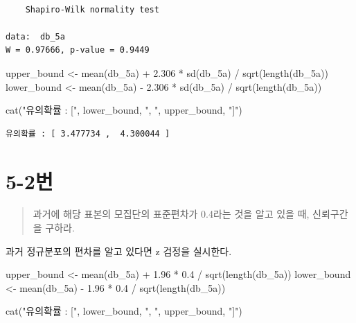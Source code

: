 \documentclass[
  letterpaper,
  DIV=11,
  numbers=noendperiod]{scrreprt}
\newenvironment{Shaded}{\begin{snugshade}}{\end{snugshade}}
\newcommand{\FloatTok}[1]{\textcolor[rgb]{0.68,0.00,0.00}{#1}}
\newcommand{\FunctionTok}[1]{\textcolor[rgb]{0.28,0.35,0.67}{#1}}
\newcommand{\NormalTok}[1]{\textcolor[rgb]{0.00,0.23,0.31}{#1}}
\newcommand{\OtherTok}[1]{\textcolor[rgb]{0.00,0.23,0.31}{#1}}
\newcommand{\SpecialCharTok}[1]{\textcolor[rgb]{0.37,0.37,0.37}{#1}}
\newcommand{\StringTok}[1]{\textcolor[rgb]{0.13,0.47,0.30}{#1}}
\begin{document}
\begin{verbatim}

    Shapiro-Wilk normality test

data:  db_5a
W = 0.97666, p-value = 0.9449
\end{verbatim}

\begin{Shaded}
\begin{Highlighting}[]
\NormalTok{upper\_bound }\OtherTok{\textless{}{-}} \FunctionTok{mean}\NormalTok{(db\_5a) }\SpecialCharTok{+} \FloatTok{2.306} \SpecialCharTok{*} \FunctionTok{sd}\NormalTok{(db\_5a) }\SpecialCharTok{/} \FunctionTok{sqrt}\NormalTok{(}\FunctionTok{length}\NormalTok{(db\_5a))}
\NormalTok{lower\_bound }\OtherTok{\textless{}{-}} \FunctionTok{mean}\NormalTok{(db\_5a) }\SpecialCharTok{{-}} \FloatTok{2.306} \SpecialCharTok{*} \FunctionTok{sd}\NormalTok{(db\_5a) }\SpecialCharTok{/} \FunctionTok{sqrt}\NormalTok{(}\FunctionTok{length}\NormalTok{(db\_5a))}

\FunctionTok{cat}\NormalTok{(}\StringTok{"유의확률 : ["}\NormalTok{, lower\_bound, }\StringTok{", "}\NormalTok{, upper\_bound, }\StringTok{"]"}\NormalTok{)}
\end{Highlighting}
\end{Shaded}

\begin{verbatim}
유의확률 : [ 3.477734 ,  4.300044 ]
\end{verbatim}

\hypertarget{uxbc88-76}{%
\section*{5-2번}\label{uxbc88-76}}


\begin{quote}
과거에 해당 표본의 모집단의 표준편차가 0.4라는 것을 알고 있을 때,
신뢰구간을 구하라.
\end{quote}

과거 정규분포의 편차를 알고 있다면 z 검정을 실시한다.

\begin{Shaded}
\begin{Highlighting}[]
\NormalTok{upper\_bound }\OtherTok{\textless{}{-}} \FunctionTok{mean}\NormalTok{(db\_5a) }\SpecialCharTok{+} \FloatTok{1.96} \SpecialCharTok{*} \FloatTok{0.4} \SpecialCharTok{/} \FunctionTok{sqrt}\NormalTok{(}\FunctionTok{length}\NormalTok{(db\_5a))}
\NormalTok{lower\_bound }\OtherTok{\textless{}{-}} \FunctionTok{mean}\NormalTok{(db\_5a) }\SpecialCharTok{{-}} \FloatTok{1.96} \SpecialCharTok{*} \FloatTok{0.4} \SpecialCharTok{/} \FunctionTok{sqrt}\NormalTok{(}\FunctionTok{length}\NormalTok{(db\_5a))}

\FunctionTok{cat}\NormalTok{(}\StringTok{"유의확률 : ["}\NormalTok{, lower\_bound, }\StringTok{", "}\NormalTok{, upper\_bound, }\StringTok{"]"}\NormalTok{)}
\end{Highlighting}
\end{Shaded}
\end{document}
